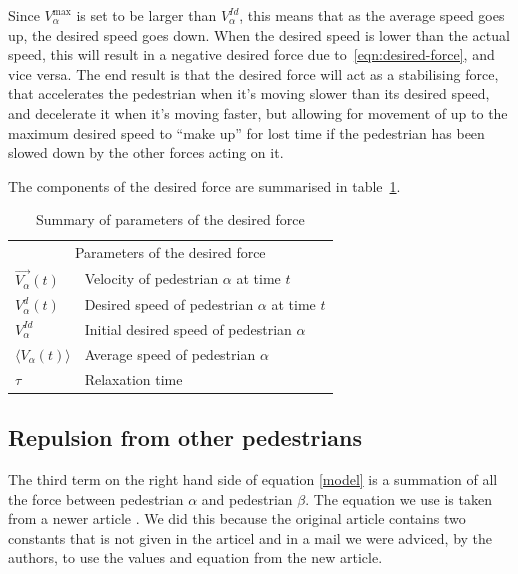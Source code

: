Since $V^{\text{max}}_\alpha$ is set to be larger than $V^{Id}_\alpha$, this 
means that as the average speed goes up, the desired speed goes down.  When 
the desired speed is lower than the actual speed, this will result in a 
negative desired force due to~\eqref{eqn:desired-force}, and vice versa. The 
end result is that the desired force will act as a stabilising force, that 
accelerates the pedestrian when it's moving slower than its desired speed, and 
decelerate it when it's moving faster, but allowing for movement of up to the 
maximum desired speed to ``make up'' for lost time if the pedestrian has been 
slowed down by the other forces acting on it.

The components of the desired force are summarised in 
table~\ref{tbl:desired-force}.

\begin{table}[h]
    \centering
    \begin{tabular}{l l}
        \toprule
        \multicolumn{2}{c}{\textsf{Parameters of the desired force}}\\
        $\overrightarrow{V_{\alpha}}(t)$ & Velocity of pedestrian $\alpha$ 
        at time $t$\\
        $V_{\alpha}^{d}(t)$ & Desired speed of pedestrian $\alpha$ at time 
        $t$\\
        $V_{\alpha}^{Id}$ & Initial desired speed of pedestrian $\alpha$ \\
        $\langle V_{\alpha}(t) \rangle$ & Average speed of pedestrian 
        $\alpha$ \\
        $\tau$& Relaxation time \\
        \bottomrule
    \end{tabular}
    \caption{Summary of parameters of the desired force}
    \label{tbl:desired-force}
\end{table}

\subsection{Repulsion from other pedestrians}\label{seq:repulsion-pedestrians}
The third term on the right hand side of equation \eqref{model} is a summation of all the 
force between pedestrian $\alpha$ and pedestrian $\beta$. The equation we use is taken from a newer article \cite{ABconstant}. We did this because the original article contains two constants that is not given in the articel and in a mail we were adviced, by the authors, to use the values and equation from the new article. 

